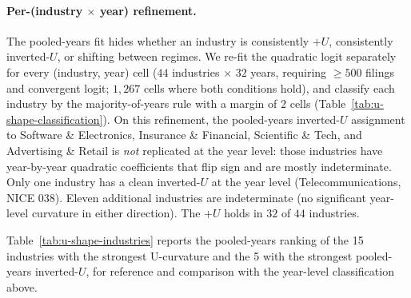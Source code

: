 \documentclass[11pt]{article}
\begin{document}
\paragraph{Per-(industry $\times$ year) refinement.} The pooled-years
fit hides whether an industry is consistently $+U$, consistently
inverted-$U$, or shifting between regimes. We re-fit the quadratic
logit separately for every (industry, year) cell ($44$ industries
$\times$ $32$ years, requiring $\geq 500$ filings and convergent
logit; $1{,}267$ cells where both conditions hold), and classify each
industry by the majority-of-years rule with a margin of $2$ cells
(Table~\ref{tab:u-shape-classification}). On this refinement, the
pooled-years inverted-$U$ assignment to Software \& Electronics,
Insurance \& Financial, Scientific \& Tech, and Advertising \&
Retail is \emph{not} replicated at the year level: those industries
have year-by-year quadratic coefficients that flip sign and are
mostly indeterminate. Only one industry has a clean inverted-$U$ at
the year level (Telecommunications, NICE 038). Eleven additional
industries are indeterminate (no significant year-level curvature
in either direction). The $+U$ holds in $32$ of $44$ industries.

\begin{table}[h]
\centering
\small

\caption{$U$-shape classification of $44$ NICE classes individually
(majority-of-years rule, margin $= 2$) and of the $1{,}267$
$($industry, year$)$ cells where a logit fit converged on $\geq 500$
filings. The pooled $+U$ holds in $32$ of $44$ industries; only $1$
has a significant inverted-$U$ (Telecommunications); the remaining
$11$ are indeterminate, not inverted-$U$. Cell-level: $27\%$ have a
significant $+U$ on $\Delta KL$, $6\%$ a significant inverted-$U$,
$67\%$ indeterminate. Linear-direction counting at the cell level
shows a striking asymmetry: $38\%$ of cells have a significant
linear advantage to \emph{negative} $\Delta KL$ (the harvest
direction), versus $16\%$ with a significant linear advantage to
positive $\Delta KL$.}
\label{tab:u-shape-classification}
\end{table}

Table~\ref{tab:u-shape-industries}
reports the pooled-years ranking of the 15 industries with the
strongest U-curvature and the 5 with the strongest pooled-years
inverted-$U$, for reference and comparison with the year-level
classification above.

\begin{table}[h]
\centering
\caption{Per-industry quadratic coefficient on $z(\Delta KL)^2$
for 5y registration-renewal. Top 15 (most pronounced U) and
bottom 5. Asterisk = $|t| > 1.96$.}
\label{tab:u-shape-industries}

\end{table}
\end{document}
